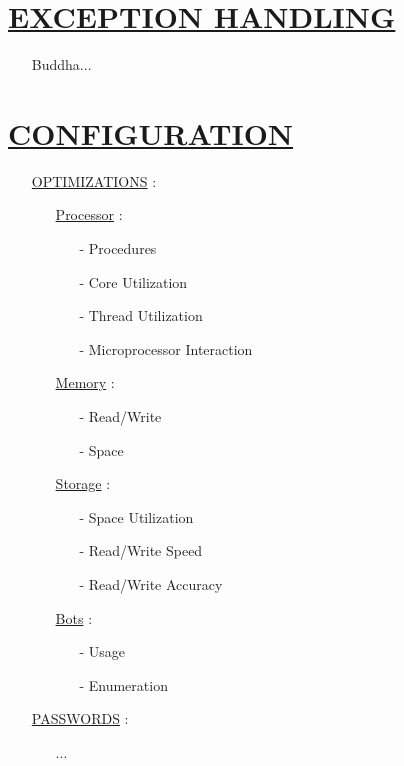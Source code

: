 \documentclass[11pt]{article}
\begin{document}
\section*{\ul{EXCEPTION HANDLING}}
\begin{enumerate}
	\item[] Buddha...
\end{enumerate}


\section*{\ul{CONFIGURATION}}
\begin{enumerate}
	
	\item[] \ul{OPTIMIZATIONS} :
	\begin{enumerate}
		\item[] \ul{Processor}  :
		\begin{enumerate}
			\item[-] Procedures
			\item[-] Core Utilization
			\item[-] Thread Utilization
			\item[-] Microprocessor Interaction
		\end{enumerate}
	
		\item[] \ul{Memory}  :
		\begin{enumerate}
			\item[-] Read/Write
			\item[-] Space
		\end{enumerate}
	
		\item[] \ul{Storage}  :
		\begin{enumerate}
			\item[-] Space Utilization
			\item[-] Read/Write Speed
			\item[-] Read/Write Accuracy
		\end{enumerate}
	
		\item[] \ul{Bots}  :
		\begin{enumerate}
			\item[-] Usage
			\item[-] Enumeration
		\end{enumerate}
	\end{enumerate}

	\item[] \ul{PASSWORDS} :
	\begin{enumerate}
		\item[] ...
	\end{enumerate}

\end{enumerate}
\end{document}
